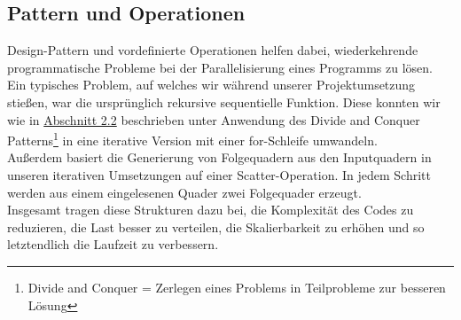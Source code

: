 % 
% 
% 
% 
% 
% 

\subsection{Pattern und Operationen}
\vspace{-0.25cm}
Design-Pattern und vordefinierte Operationen helfen dabei, wiederkehrende programmatische Probleme bei der Parallelisierung eines Programms zu lösen.
Ein typisches Problem, auf welches wir während unserer Projektumsetzung stießen, war die ursprünglich rekursive sequentielle Funktion. Diese konnten
wir wie in \hyperref[iterativ]{Abschnitt 2.2} beschrieben unter Anwendung des Divide and Conquer Patterns\footnote{Divide and Conquer = Zerlegen eines Problems in Teilprobleme zur besseren Lösung} in eine 
iterative Version mit einer for-Schleife umwandeln. \\
Außerdem basiert die Generierung von Folgequadern aus den Inputquadern in unseren iterativen Umsetzungen auf einer Scatter-Operation. In jedem Schritt werden
aus einem eingelesenen Quader zwei Folgequader erzeugt.\\
Insgesamt tragen diese Strukturen dazu bei, die Komplexität des Codes zu reduzieren, die Last besser zu verteilen, die Skalierbarkeit zu erhöhen und so 
letztendlich die Laufzeit zu verbessern. 

